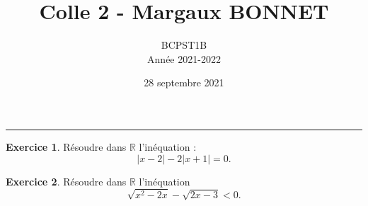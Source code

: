 \documentclass[a4paper, 11pt,openany]{article}%
\title{Colle 2 - Margaux BONNET}
\author{BCPST1B\\
Année 2021-2022}
\date{28 septembre 2021}
\theoremstyle{plain}
\theoremstyle{definition}
\newtheorem{exo}{Exercice}
\newtheorem{sol}{Solution de l'exercice}
\theoremstyle{remark}
\newcommand{\R}{\mathbb{R}}
\begin{document}
   \maketitle
      \rule{\linewidth}{0.5mm}



\begin{exo}
Résoudre dans $\R$ l'inéquation :
\[ |x -2| - 2 |x+1| = 0.\]
\end{exo}




\begin{exo}
Résoudre dans $\R$ l'inéquation
\[\sqrt{x^2 - 2x} - \sqrt{2x-3} < 0.\]
\end{exo}
\end{document}
